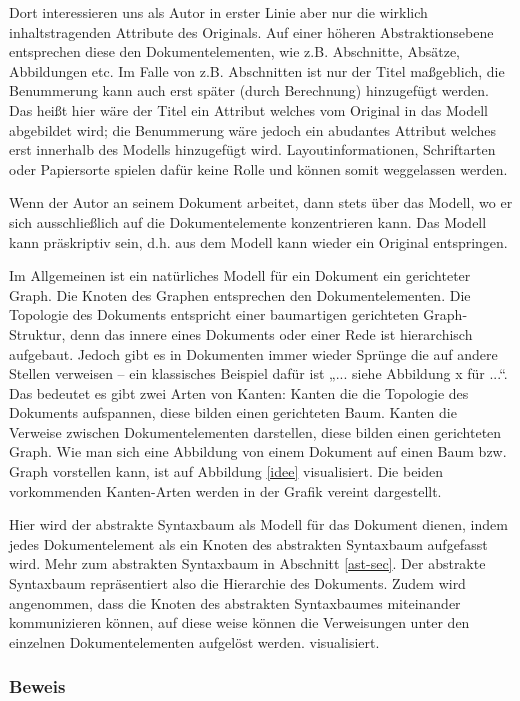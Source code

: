  
Dort interessieren uns als Autor in erster Linie aber nur die wirklich inhaltstragenden Attribute des Originals. Auf einer höheren Abstraktionsebene entsprechen diese den Dokumentelementen, wie z.B. Abschnitte, Absätze, Abbildungen etc. Im Falle von z.B. Abschnitten ist nur der Titel maßgeblich, die Benummerung kann auch erst später (durch Berechnung) hinzugefügt werden. Das heißt hier wäre der Titel ein Attribut welches vom Original in das Modell abgebildet wird; die Benummerung wäre jedoch ein abudantes Attribut welches erst innerhalb des Modells hinzugefügt wird. Layoutinformationen, Schriftarten oder Papiersorte spielen dafür keine Rolle und können somit weggelassen werden.

 
Wenn der Autor an seinem Dokument arbeitet, dann stets über das Modell, wo er sich ausschließlich auf die Dokumentelemente konzentrieren kann. Das Modell kann präskriptiv sein, d.h. aus dem Modell kann wieder ein Original entspringen.

 
Im Allgemeinen ist ein natürliches Modell für ein Dokument ein gerichteter Graph. Die Knoten des Graphen entsprechen den Dokumentelementen. Die Topologie des Dokuments entspricht einer baumartigen gerichteten Graph-Struktur, denn das innere eines Dokuments oder einer Rede ist hierarchisch aufgebaut. Jedoch gibt es in Dokumenten immer wieder Sprünge die auf andere Stellen verweisen -- ein klassisches Beispiel dafür ist „... siehe Abbildung x für ...“. Das bedeutet es gibt zwei Arten von Kanten: Kanten die die Topologie des Dokuments aufspannen, diese bilden einen gerichteten Baum. Kanten die Verweise zwischen Dokumentelementen darstellen, diese bilden einen gerichteten Graph. Wie man sich eine Abbildung von einem Dokument auf einen Baum bzw. Graph vorstellen kann, ist auf Abbildung \ref{idee} visualisiert. Die beiden vorkommenden Kanten-Arten werden in der Grafik vereint dargestellt.

 
Hier wird der abstrakte Syntaxbaum als Modell für das Dokument dienen, indem jedes Dokumentelement als ein Knoten des abstrakten Syntaxbaum aufgefasst wird. Mehr zum abstrakten Syntaxbaum in Abschnitt \ref{ast-sec}. Der abstrakte Syntaxbaum repräsentiert also die Hierarchie des Dokuments. Zudem wird angenommen, dass die Knoten des abstrakten Syntaxbaumes miteinander kommunizieren können, auf diese weise können die Verweisungen unter den einzelnen Dokumentelementen aufgelöst werden. visualisiert.

 
\subsubsection{Beweis}\label{}

